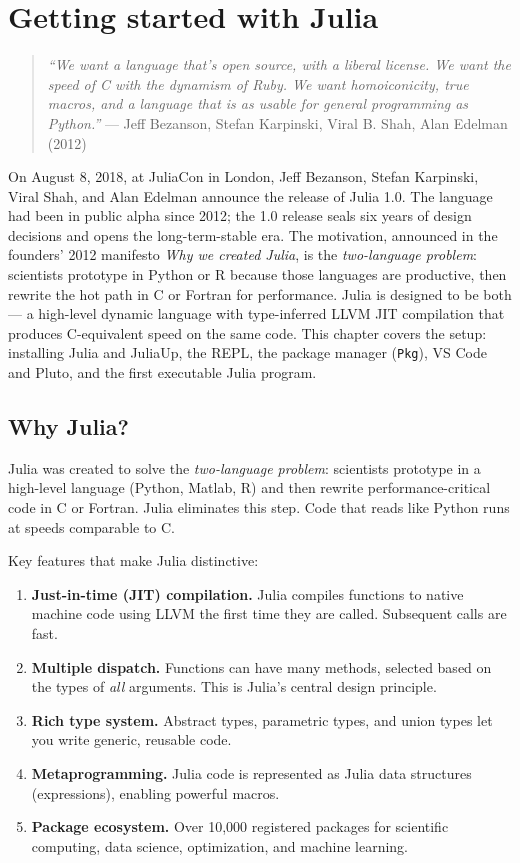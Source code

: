 \chapter{Getting started with Julia}
\label{ch:getting-started}

\begin{quote}
\emph{``We want a language that's open source, with a liberal license. We want the speed of C with the dynamism of Ruby. We want homoiconicity, true macros, and a language that is as usable for general programming as Python.''}
--- Jeff Bezanson, Stefan Karpinski, Viral B. Shah, Alan Edelman (2012)
\end{quote}

On August 8, 2018, at JuliaCon in London, Jeff Bezanson, Stefan Karpinski, Viral Shah, and Alan Edelman announce the release of Julia 1.0. The language had been in public alpha since 2012; the 1.0 release seals six years of design decisions and opens the long-term-stable era. The motivation, announced in the founders' 2012 manifesto \emph{Why we created Julia}, is the \emph{two-language problem}: scientists prototype in Python or R because those languages are productive, then rewrite the hot path in C or Fortran for performance. Julia is designed to be both --- a high-level dynamic language with type-inferred LLVM JIT compilation that produces C-equivalent speed on the same code. This chapter covers the setup: installing Julia and JuliaUp, the REPL, the package manager (\texttt{Pkg}), VS Code and Pluto, and the first executable Julia program.

\section{Why Julia?}

Julia was created to solve the \emph{two-language problem}: scientists prototype in a high-level language (Python, Matlab, R) and then rewrite performance-critical code in C or Fortran. Julia eliminates this step. Code that reads like Python runs at speeds comparable to C.

Key features that make Julia distinctive:

\begin{enumerate}
  \item \textbf{Just-in-time (JIT) compilation.} Julia compiles functions to native machine code using LLVM the first time they are called. Subsequent calls are fast.
  \item \textbf{Multiple dispatch.} Functions can have many methods, selected based on the types of \emph{all} arguments. This is Julia's central design principle.
  \item \textbf{Rich type system.} Abstract types, parametric types, and union types let you write generic, reusable code.
  \item \textbf{Metaprogramming.} Julia code is represented as Julia data structures (expressions), enabling powerful macros.
  \item \textbf{Package ecosystem.} Over 10,000 registered packages for scientific computing, data science, optimization, and machine learning.
\end{enumerate}


